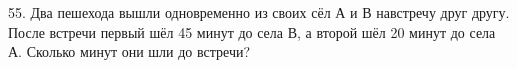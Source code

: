 55. Два пешехода вышли одновременно из своих сёл А и В навстречу друг другу. После встречи первый шёл 45 минут до села В, а второй шёл 20 минут до села А. Сколько минут они шли до встречи?\\
